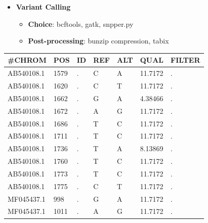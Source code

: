 \documentclass{beamer}
\begin{document}
\begin{frame}[t]
	\begin{itemize}
		\item \textbf{Variant Calling}
		      \begin{itemize}
		      	\item \textbf{Choice}: bcftools, gatk, snpper.py
		      	\item \textbf{Post-processing}: bunzip compression, tabix
		      \end{itemize}
		                      
	\end{itemize}
	
	\begin{table}[!ht]
		\centering
		\begin{tabular}{|l|l|l|l|l|l|l|}
			\hline
			\textbf{\#CHROM} & \textbf{POS} & \textbf{ID} & \textbf{REF} & \textbf{ALT} & \textbf{QUAL} & \textbf{FILTER} \\ \hline
			AB540108.1       & 1579         & .           & C            & A            & 11.7172       & .               \\ \hline
			AB540108.1       & 1620         & .           & C            & T            & 11.7172       & .               \\ \hline
			AB540108.1       & 1662         & .           & G            & A            & 4.38466       & .               \\ \hline
			AB540108.1       & 1672         & .           & A            & G            & 11.7172       & .               \\ \hline
			AB540108.1       & 1686         & .           & T            & C            & 11.7172       & .               \\ \hline
			AB540108.1       & 1711         & .           & T            & C            & 11.7172       & .               \\ \hline
			AB540108.1       & 1736         & .           & T            & A            & 8.13869       & .               \\ \hline
			AB540108.1       & 1760         & .           & T            & C            & 11.7172       & .               \\ \hline
			AB540108.1       & 1773         & .           & T            & C            & 11.7172       & .               \\ \hline
			AB540108.1       & 1775         & .           & C            & T            & 11.7172       & .               \\ \hline
			MF045437.1       & 998          & .           & G            & A            & 11.7172       & .               \\ \hline
			MF045437.1       & 1011         & .           & A            & G            & 11.7172       & .               \\ \hline
		\end{tabular}
	\end{table}
\end{frame}
\end{document}
